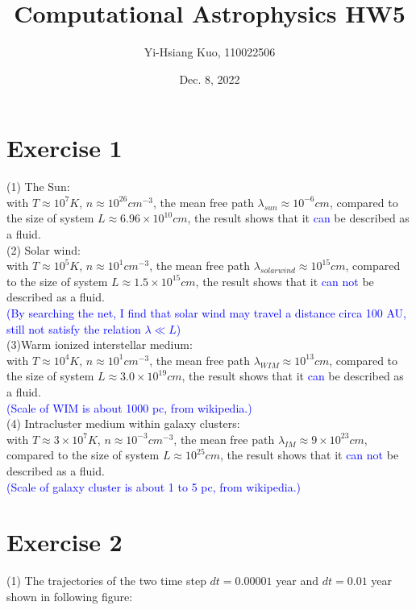 \documentclass[aps,12pt,prd,nofootinbib,bibnotes, amsmath,amssymb,showpacs,superscriptaddress,floatfix]{revtex4-2}
\begin{document}
\title{Computational Astrophysics HW5}
\author{Yi-Hsiang Kuo, 110022506}
\date{Dec. 8, 2022}
\maketitle
\section{Exercise 1}
(1) The Sun: \\
with $T \approx 10^7 K$, $n \approx 10^{26} cm^{-3}$, the mean free path $\lambda_{sun} \approx 10^{-6} cm$, compared to the size of system $L \approx 6.96 \times 10^{10} cm$, the result shows that it \textcolor{blue}{can} be described as a fluid.\\ 

(2) Solar wind: \\
with $T \approx 10^5 K$, $n \approx 10^1 cm^{-3}$, the mean free path $\lambda_{solar wind} \approx 10^{15} cm$, compared to the size of system $L \approx 1.5 \times 10^{15} cm$, the result shows that it \textcolor{blue}{can not} be described as a fluid. \\
\textcolor{blue}{(By searching the net, I find that solar wind may travel a distance circa 100 AU, still not satisfy the relation $\lambda \ll L$)} \\

(3)Warm ionized interstellar medium: \\
with $T \approx 10^4 K$, $n \approx 10^1 cm^{-3}$, the mean free path $\lambda_{WIM} \approx 10^{13} cm$, compared to the size of system $L \approx 3.0 \times 10^{19} cm$, the result shows that it \textcolor{blue}{can} be described as a fluid. \\
\textcolor{blue}{(Scale of WIM is about 1000 pc, from wikipedia.)} \\

(4) Intracluster medium within galaxy clusters: \\
with $T \approx 3 \times 10^7 K$, $n \approx 10^{-3} cm^{-3}$, the mean free path $\lambda_{IM} \approx 9 \times 10^{23} cm$, compared to the size of system $L \approx 10^{25} cm$, the result shows that it \textcolor{blue}{can not} be described as a fluid. \\
\textcolor{blue}{(Scale of galaxy cluster is about 1 to 5 pc, from wikipedia.)} 
\section{Exercise 2}
(1)
The trajectories of the two time step $dt=0.00001$ year and $dt=0.01$ year shown in following figure:
\end{document}
